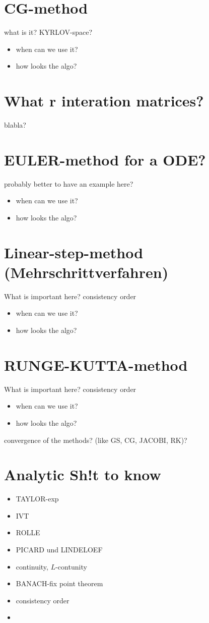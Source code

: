 \documentclass[]{scrartcl}
\newcommand{\<}{\trianglelefteq}
\begin{document}
\section*{CG-method}
what is it? KYRLOV-space?
\begin{itemize}
	\item when can we use it?\\
	\item how looks the algo?\\
\end{itemize}

\section*{What r interation matrices?}
blabla?

\section*{EULER-method for a ODE?}
probably better to have an example here?
\begin{itemize}
	\item when can we use it?\\
	\item how looks the algo?\\
\end{itemize}

\section*{Linear-step-method (Mehrschrittverfahren)}
What is important here? consistency order
\begin{itemize}
	\item when can we use it?\\
	\item how looks the algo?\\
\end{itemize}

\section*{RUNGE-KUTTA-method}
What is important here? consistency order
\begin{itemize}
	\item when can we use it?\\
	\item how looks the algo?\\
\end{itemize}

convergence of the methods? (like GS, CG, JACOBI, RK)?

\section*{Analytic Sh!t to know}
\begin{itemize}
	\item TAYLOR-exp
	\item IVT
	\item ROLLE
	\item PICARD und LINDELOEF
	\item continuity, $L$-contunity
	\item BANACH-fix point theorem
	\item consistency order
	\item 
\end{itemize}
\end{document}
